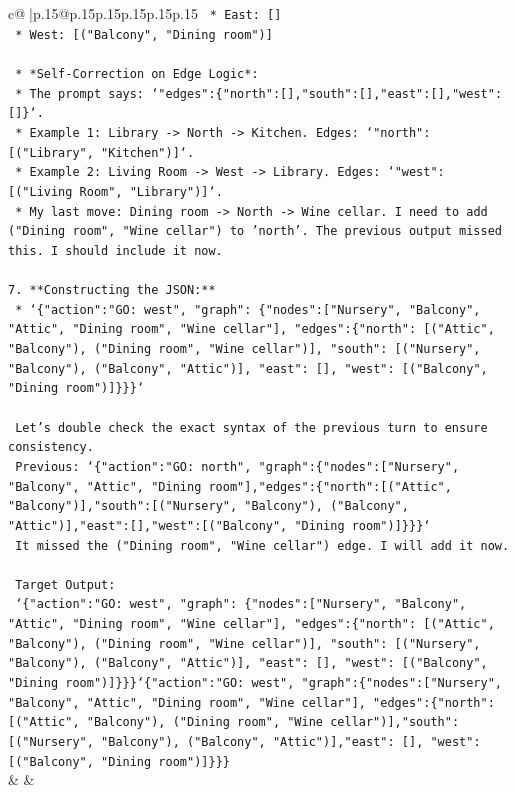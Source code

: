 \documentclass{article}
\begin{document}
{\begin{supertabular}{c@{$\;$}|p{.15\linewidth}@{}p{.15\linewidth}p{.15\linewidth}p{.15\linewidth}p{.15\linewidth}p{.15\linewidth}}
{{{\texttt{        *   East: {[}{]}} \\
\texttt{        *   West: {[}("Balcony", "Dining room"){]}} \\
\\ 
\texttt{    *   *Self{-}Correction on Edge Logic*:} \\
\texttt{        *   The prompt says: `"edges":\{"north":{[}{]},"south":{[}{]},"east":{[}{]},"west":{[}{]}\}`.} \\
\texttt{        *   Example 1: Library {-}> North {-}> Kitchen. Edges: `"north": {[}("Library", "Kitchen"){]}`.} \\
\texttt{        *   Example 2: Living Room {-}> West {-}> Library. Edges: `"west": {[}("Living Room", "Library"){]}`.} \\
\texttt{        *   My last move: Dining room {-}> North {-}> Wine cellar. I need to add ("Dining room", "Wine cellar") to 'north'. The previous output missed this. I should include it now.} \\
\\ 
\texttt{7.  **Constructing the JSON:**} \\
\texttt{    *   `\{"action":"GO: west", "graph": \{"nodes":{[}"Nursery", "Balcony", "Attic", "Dining room", "Wine cellar"{]}, "edges":\{"north": {[}("Attic", "Balcony"), ("Dining room", "Wine cellar"){]}, "south": {[}("Nursery", "Balcony"), ("Balcony", "Attic"){]}, "east": {[}{]}, "west": {[}("Balcony", "Dining room"){]}\}\}\}`} \\
\\ 
\texttt{    Let's double check the exact syntax of the previous turn to ensure consistency.} \\
\texttt{    Previous: `\{"action":"GO: north", "graph":\{"nodes":{[}"Nursery", "Balcony", "Attic", "Dining room"{]},"edges":\{"north":{[}("Attic", "Balcony"){]},"south":{[}("Nursery", "Balcony"), ("Balcony", "Attic"){]},"east":{[}{]},"west":{[}("Balcony", "Dining room"){]}\}\}\}`} \\
\texttt{    It missed the ("Dining room", "Wine cellar") edge. I will add it now.} \\
\\ 
\texttt{    Target Output:} \\
\texttt{    `\{"action":"GO: west", "graph": \{"nodes":{[}"Nursery", "Balcony", "Attic", "Dining room", "Wine cellar"{]}, "edges":\{"north": {[}("Attic", "Balcony"), ("Dining room", "Wine cellar"){]}, "south": {[}("Nursery", "Balcony"), ("Balcony", "Attic"){]}, "east": {[}{]}, "west": {[}("Balcony", "Dining room"){]}\}\}\}`\{"action":"GO: west", "graph":\{"nodes":{[}"Nursery", "Balcony", "Attic", "Dining room", "Wine cellar"{]}, "edges":\{"north": {[}("Attic", "Balcony"), ("Dining room", "Wine cellar"){]},"south": {[}("Nursery", "Balcony"), ("Balcony", "Attic"){]},"east": {[}{]}, "west": {[}("Balcony", "Dining room"){]}\}\}\}} \\
            }
        }
    }
    & & \\ \\


\end{supertabular}}
\end{document}
